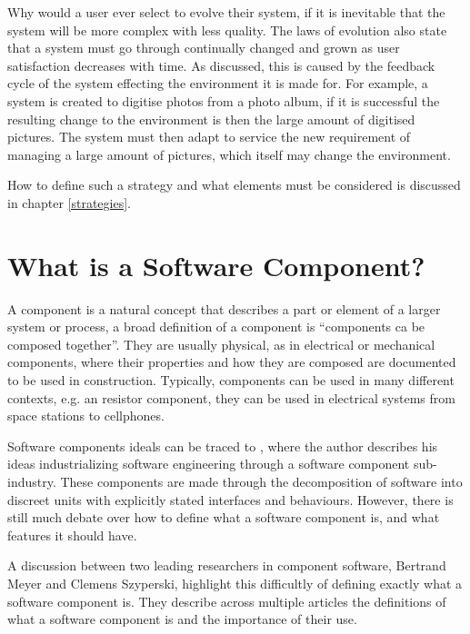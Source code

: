 Why would a user ever select to evolve their system, if it is inevitable that the system will be more complex with less quality. 
The laws of evolution also state that a system must go through continually changed and grown as user satisfaction decreases with time.
As discussed, this is caused by the feedback cycle of the system effecting the environment it is made for.
For example, a system is created to digitise photos from a photo album, if it is successful the resulting change to the environment is then the large amount of digitised pictures.
The system must then adapt to service the new requirement of managing a large amount of pictures, which itself may change the environment.

How to define such a strategy and what elements must be considered is discussed in chapter \ref{strategies}.

\section{What is a Software Component?}
\label{background.components}
A component is a natural concept that describes a part or element of a larger system or process,
a broad definition of a component is ``components ca be composed together''.
They are usually physical, as in electrical or mechanical components, where their properties and how they are composed are documented to be used in construction.
Typically, components can be used in many different contexts, e.g. an resistor component, they can be used in electrical systems from space stations to cellphones.   

Software components ideals can be traced to \cite{McIlroy1969}, where the author describes his ideas industrializing software engineering through a software component sub-industry. 
These components are made through the decomposition of software into discreet units with explicitly stated interfaces and behaviours.
However, there is still much debate over how to define what a software component is, and what features it should have.

A discussion between two leading researchers in component software, Bertrand Meyer and Clemens Szyperski, highlight this difficultly of defining exactly what a software component is. 
They describe across multiple articles \cite{Meyer1999,Szyperski2000a, Szyperski2000, Meyer2000,} the definitions of what a software component is and the importance of their use.

